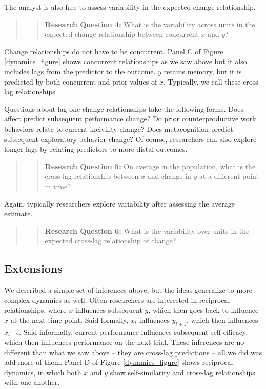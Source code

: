 \documentclass[english,,man]{apa6}
\begin{document}
The analyst is also free to assess variability in the expected change relationship.

\begin{quote}
\begin{quote}
\textbf{Research Question 4:} What is the variability across units in the expected change relationship between concurrent \(x\) and \(y\)?
\end{quote}
\end{quote}

Change relationships do not have to be concurrent. Panel C of Figure \ref{dynamics_figure} shows concurrent relationships as we saw above but it also includes lags from the predictor to the outcome. \(y\) retains memory, but it is predicted by both concurrent and prior values of \(x\). Typically, we call these cross-lag relationships.

Questions about lag-one change relationships take the following forms. Does affect predict subsequent performance change? Do prior counterproductive work behaviors relate to current incivility change? Does metacognition predict subsequent exploratory behavior change? Of course, researchers can also explore longer lags by relating predictors to more distal outcomes.

\begin{quote}
\begin{quote}
\textbf{Research Question 5:} On average in the population, what is the cross-lag relationship between \(x\) and change in \(y\) at a different point in time?
\end{quote}
\end{quote}

Again, typically researchers explore variability after assessing the average estimate.

\begin{quote}
\begin{quote}
\textbf{Research Question 6:} What is the variability over units in the expected cross-lag relationship of change?
\end{quote}
\end{quote}

\hypertarget{extensions}{%
\subsection{Extensions}\label{extensions}}

We described a simple set of inferences above, but the ideas generalize to more complex dynamics as well. Often researchers are interested in reciprocal relationships, where \(x\) influences subsequent \(y\), which then goes back to influence \(x\) at the next time point. Said formally, \(x_t\) influences \(y_{t+1}\), which then influences \(x_{t+2}\). Said informally, current performance influences subsequent self-efficacy, which then influences performance on the next trial. These inferences are no different than what we saw above -- they are cross-lag predictions -- all we did was add more of them. Panel D of Figure \ref{dynamics_figure} shows reciprocal dynamics, in which both \(x\) and \(y\) show self-similarity and cross-lag relationships with one another.
\end{document}
